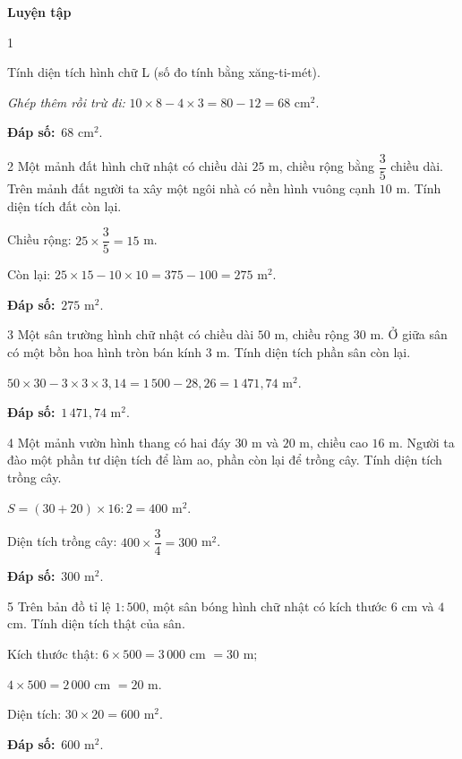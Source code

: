 \documentclass[11pt]{article}
\newif\ifsol \solfalse
\providecommand{\AnsWord}{Đáp số}
\newcommand{\dapso}[1]{\par\textbf{\AnsWord:}\ #1}
\newcommand{\probsol}[1]{%
  \begin{lrbox}{\solmeasure}\begin{minipage}{\dimexpr\linewidth-24pt\relax}#1\end{minipage}\end{lrbox}%
  \ifsol
    \begin{solbox}#1\end{solbox}%
  \else
    \setlength{\solht}{\dimexpr\ht\solmeasure+\dp\solmeasure+0.85cm\relax}%
    \ifdim\solht<1.35cm\setlength{\solht}{1.35cm}\fi
    \begin{tcolorbox}[colback=white,colframe=Line,boxrule=0.8pt,arc=5pt,
      left=8pt,right=8pt,top=4pt,bottom=4pt,height=\solht]{\footnotesize\color{Slate}\itshape\WorkWord}\end{tcolorbox}%
  \fi}
\newcommand{\dividerbar}[1]{\par\vspace{0.6em}\noindent
  \begin{tcolorbox}[enhanced,frame hidden,interior hidden,borderline west={5pt}{0pt}{ProbBlue},
    colback=white,left=12pt,right=12pt,top=5pt,bottom=5pt,arc=4pt]
  {\large\bfseries\color{ProbBlue} #1}\end{tcolorbox}\vspace{0.4em}}
\newcommand{\gap}{\vspace{0.3cm}}
\def\WorkWord{Bài làm:}
\def\AnsWord{Đáp số}
\begin{document}
\dividerbar{Luyện tập}
\begin{probbox}{1}{\relax}
\begin{minipage}[t]{0.66\linewidth}
Tính diện tích hình chữ L (số đo tính bằng xăng-ti-mét).
\end{minipage}\hfill
\begin{minipage}[t]{0.3\linewidth}\vspace{0pt}\centering
{}
\end{minipage}
\end{probbox}
\probsol{
\emph{Ghép thêm rồi trừ đi:} $10\times8-4\times3=80-12=68$ cm$^2$.
\dapso{$68$ cm$^2$.}}
\gap
\begin{probbox}{2}{\relax}
Một mảnh đất hình chữ nhật có chiều dài $25$ m, chiều rộng bằng $\dfrac35$ chiều dài. Trên mảnh đất người ta xây một ngôi nhà có nền hình vuông cạnh $10$ m. Tính diện tích đất còn lại.
\end{probbox}
\probsol{
Chiều rộng: $25\times\dfrac35=15$ m.\par Còn lại: $25\times15-10\times10=375-100=275$ m$^2$.
\dapso{$275$ m$^2$.}}
\gap
\begin{probbox}{3}{\relax}
Một sân trường hình chữ nhật có chiều dài $50$ m, chiều rộng $30$ m. Ở giữa sân có một bồn hoa hình tròn bán kính $3$ m. Tính diện tích phần sân còn lại.
\end{probbox}
\probsol{
$50\times30-3\times3\times3{,}14=1\,500-28{,}26=1\,471{,}74$ m$^2$.
\dapso{$1\,471{,}74$ m$^2$.}}
\gap
\begin{probbox}{4}{\relax}
Một mảnh vườn hình thang có hai đáy $30$ m và $20$ m, chiều cao $16$ m. Người ta đào một phần tư diện tích để làm ao, phần còn lại để trồng cây. Tính diện tích trồng cây.
\end{probbox}
\probsol{
$S=(30+20)\times16:2=400$ m$^2$.\par Diện tích trồng cây: $400\times\dfrac34=300$ m$^2$.
\dapso{$300$ m$^2$.}}
\gap
\begin{probbox}{5}{\relax}
Trên bản đồ tỉ lệ $1:500$, một sân bóng hình chữ nhật có kích thước $6$ cm và $4$ cm. Tính diện tích thật của sân.
\end{probbox}
\probsol{
Kích thước thật: $6\times500=3\,000$ cm $=30$ m;\par $4\times500=2\,000$ cm $=20$ m.\par Diện tích: $30\times20=600$ m$^2$.
\dapso{$600$ m$^2$.}}
\end{document}
